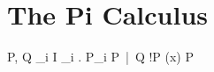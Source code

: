 \section{The Pi Calculus}

\begin{grammar}
P, Q
\grm \Sigma_{i \in I} \pi_i . P_i
\alt P\ |\ Q
\alt !P
\alt (\nu x) P
\end{grammar}

